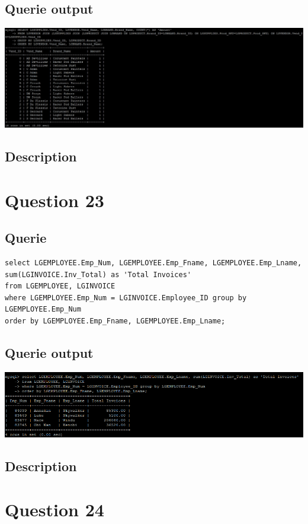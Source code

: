 \documentclass[a4paper,10pt]{article}
\begin{document}
\subsection{Querie output}
           \includegraphics{Queries/Question_22/Q22_screenshot.jpg}
\subsection{Description}\section*{Question 23}
 \subsection{Querie}
          \lstset{
            language=SQL,
            breaklines=true
            }
        \begin{lstlisting}[frame=single]
        select LGEMPLOYEE.Emp_Num, LGEMPLOYEE.Emp_Fname, LGEMPLOYEE.Emp_Lname, sum(LGINVOICE.Inv_Total) as 'Total Invoices' 
from LGEMPLOYEE, LGINVOICE 
where LGEMPLOYEE.Emp_Num = LGINVOICE.Employee_ID group by LGEMPLOYEE.Emp_Num 
order by LGEMPLOYEE.Emp_Fname, LGEMPLOYEE.Emp_Lname;
        \end{lstlisting}
\subsection{Querie output}
           \includegraphics{Queries/Question_23/Question_23_screenshot.PNG}
\subsection{Description}\section*{Question 24}
\end{document}
